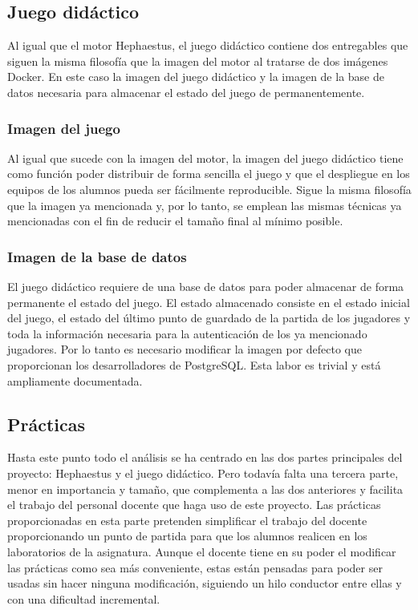 \subsection{Juego didáctico}

Al igual que el motor Hephaestus, el juego didáctico contiene dos entregables que siguen la misma filosofía que la imagen del motor al tratarse de dos imágenes Docker. En este caso la imagen del juego didáctico y la imagen de la base de datos necesaria para almacenar el estado del juego de permanentemente.

\subsubsection{Imagen del juego}

Al igual que sucede con la imagen del motor, la imagen del juego didáctico tiene como función poder distribuir de forma sencilla el juego y que el despliegue en los equipos de los alumnos pueda ser fácilmente reproducible. Sigue la misma filosofía que la imagen ya mencionada y, por lo tanto, se emplean las mismas técnicas ya mencionadas con el fin de reducir el tamaño final al mínimo posible.

\subsubsection{Imagen de la base de datos}

El juego didáctico requiere de una base de datos para poder almacenar de forma permanente el estado del juego. El estado almacenado consiste en el estado inicial del juego, el estado del último punto de guardado de la partida de los jugadores y toda la información necesaria para la autenticación de los ya mencionado jugadores. Por lo tanto es necesario modificar la imagen por defecto que proporcionan los desarrolladores de PostgreSQL. Esta labor es trivial y está ampliamente documentada.

\subsection{Prácticas}

Hasta este punto todo el análisis se ha centrado en las dos partes principales del proyecto: Hephaestus y el juego didáctico. Pero todavía falta una tercera parte, menor en importancia y tamaño, que complementa a las dos anteriores y facilita el trabajo del personal docente que haga uso de este proyecto. Las prácticas proporcionadas en esta parte pretenden simplificar el trabajo del docente proporcionando un punto de partida para que los alumnos realicen en los laboratorios de la asignatura. Aunque el docente tiene en su poder el modificar las prácticas como sea más conveniente, estas están pensadas para poder ser usadas sin hacer ninguna modificación, siguiendo un hilo conductor entre ellas y con una dificultad incremental.

